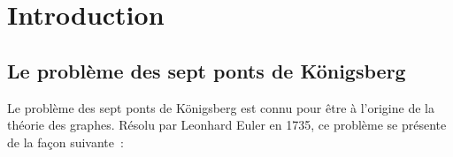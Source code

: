 \renewcommand{\cache}[1]{\phantomchoix{#1}\hspace*{0.1mm}}

\usepackage{algorithm}
\usepackage{algorithmic}
\renewcommand{\algorithmicrequire} {\textbf{\textsc{Entrées:}}}
\renewcommand{\algorithmicensure}  {\textbf{\textsc{Sorties:}}}
\renewcommand{\algorithmicwhile}   {\textbf{tantque}}
\renewcommand{\algorithmicdo}      {\textbf{faire}}
\renewcommand{\algorithmicendwhile}{\textbf{fin tantque}}
\renewcommand{\algorithmicend}     {\textbf{fin}}
\renewcommand{\algorithmicif}      {\textbf{si}}
\renewcommand{\algorithmicendif}   {\textbf{finsi}}
\renewcommand{\algorithmicelse}    {\textbf{sinon}}
\renewcommand{\algorithmicthen}    {\textbf{alors}}
\renewcommand{\algorithmicfor}     {\textbf{pour}}
\renewcommand{\algorithmicforall}  {\textbf{pour tout}}
\renewcommand{\algorithmicdo}      {\textbf{faire}}
\renewcommand{\algorithmicendfor}  {\textbf{fin pour}}
\renewcommand{\algorithmicloop}    {\textbf{boucler}}
\renewcommand{\algorithmicendloop} {\textbf{fin boucle}}
\renewcommand{\algorithmicrepeat}  {\textbf{répéter}}
\renewcommand{\algorithmicuntil}   {\textbf{jusqu'à}}


\let\mylistof\listof
\renewcommand\listof[2]{\mylistof{algorithm}{Liste des algorithmes}}

\makeatletter
\providecommand*{\toclevel@algorithm}{0}
\makeatother


\entetecoursinfo




\section{Introduction}

\subsection*{Le problème des sept ponts de Königsberg}

Le problème des sept ponts de Königsberg est connu pour être à l'origine de la théorie des graphes. Résolu par Leonhard Euler en 1735, ce problème se présente de la façon suivante~:


